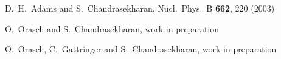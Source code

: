 \documentclass{PoS}
\begin{document}
\begin{thebibliography}{99}
  D.~H.~Adams and S.~Chandrasekharan,
  Nucl.\ Phys.\ B {\bf 662}, 220 (2003)
  
 O.~Orasch and S.~Chandrasekharan,
	work in preparation
	
 O.~Orasch, C.~Gattringer and S.~Chandrasekharan,
 work in preparation



\end{thebibliography}
\end{document}
